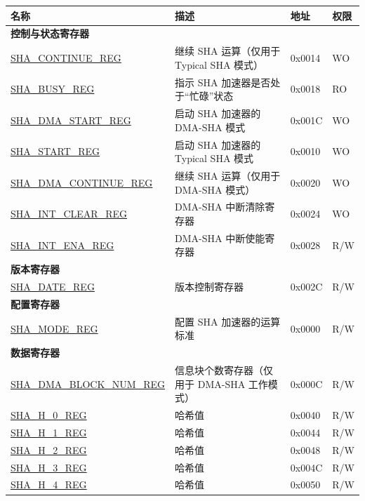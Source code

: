 \begin{longtable}{ | p{6cm} | p{7.2cm} | p{1.3cm} | p{1cm} | }
\hline\rowcolor{lightgray}
名称 & 描述 & 地址 & 权限 \\ \hline
\endhead
\multicolumn{4}{|l|}{\textbf{控制与状态寄存器}} \\ \hline
\hyperref[regdesc:SHACONTINUEREG]{SHA\_CONTINUE\_REG} & 继续 SHA 运算（仅用于 Typical SHA 模式） & 0x0014 & WO \\ \hline
\hyperref[regdesc:SHABUSYREG]{SHA\_BUSY\_REG} & 指示 SHA 加速器是否处于“忙碌”状态 & 0x0018 & RO \\ \hline
\hyperref[regdesc:SHADMASTARTREG]{SHA\_DMA\_START\_REG} & 启动 SHA  加速器的 DMA-SHA 模式 & 0x001C & WO \\ \hline
\hyperref[regdesc:SHASTARTREG]{SHA\_START\_REG} & 启动 SHA 加速器的 Typical SHA 模式 & 0x0010 & WO \\ \hline
\hyperref[regdesc:SHADMACONTINUEREG]{SHA\_DMA\_CONTINUE\_REG} & 继续 SHA 运算（仅用于 DMA-SHA 模式） & 0x0020 & WO \\ \hline
\hyperref[regdesc:SHAINTCLEARREG]{SHA\_INT\_CLEAR\_REG} & DMA-SHA 中断清除寄存器 & 0x0024 & WO \\ \hline
\hyperref[regdesc:SHAINTENAREG]{SHA\_INT\_ENA\_REG} & DMA-SHA 中断使能寄存器 & 0x0028 & R/W \\ \hline
\multicolumn{4}{|l|}{\textbf{版本寄存器}} \\ \hline
\hyperref[regdesc:SHADATEREG]{SHA\_DATE\_REG} & 版本控制寄存器 & 0x002C & R/W \\ \hline
\multicolumn{4}{|l|}{\textbf{配置寄存器}} \\ \hline
\hyperref[regdesc:SHAMODEREG]{SHA\_MODE\_REG} & 配置 SHA 加速器的运算标准 & 0x0000 & R/W \\ \hline
\multicolumn{4}{|l|}{\textbf{数据寄存器}} \\ \hline
\hyperref[regdesc:SHADMABLOCKNUMREG]{SHA\_DMA\_BLOCK\_NUM\_REG} & 信息块个数寄存器（仅用于 DMA-SHA 工作模式） & 0x000C & R/W \\ \hline
\hyperref[regdesc:SHAHNREG]{SHA\_H\_0\_REG} & 哈希值 & 0x0040 & R/W \\ \hline
\hyperref[regdesc:SHAHNREG]{SHA\_H\_1\_REG} & 哈希值 & 0x0044 & R/W \\ \hline
\hyperref[regdesc:SHAHNREG]{SHA\_H\_2\_REG} & 哈希值 & 0x0048 & R/W \\ \hline
\hyperref[regdesc:SHAHNREG]{SHA\_H\_3\_REG} & 哈希值 & 0x004C & R/W \\ \hline
\hyperref[regdesc:SHAHNREG]{SHA\_H\_4\_REG} & 哈希值 & 0x0050 & R/W \\ \hline

\end{longtable}
